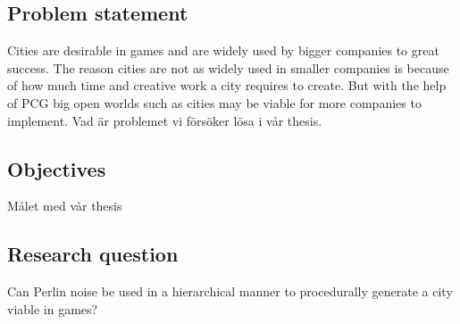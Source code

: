 \subsection{Problem statement}
Cities are desirable in games and are widely used by bigger companies to great success. The reason cities are not as widely used in smaller companies is because of how much time and creative work a city requires to create. But with the help of PCG big open worlds such as cities may be viable for more companies to implement. 
Vad är problemet vi försöker lösa i vår thesis.

\subsection{Objectives}
Målet med vår thesis

\subsection{Research question}
Can Perlin noise be used in a hierarchical manner to procedurally generate a city viable in games?
\\
